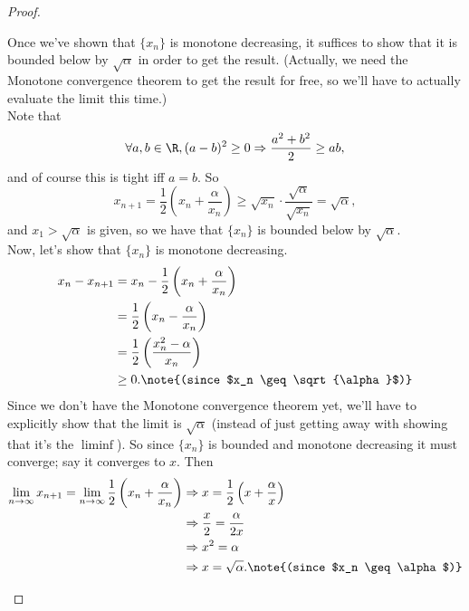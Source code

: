 \documentclass{assignment}
\begin{document}
\begin{proof}\leavevmode
  \begin{qparts}
  \item Once we've shown that $\{x_n\}$ is monotone decreasing, it suffices to show that it is bounded
  below by $\sqrt{\alpha}$ in order to get the result. (Actually, we need the Monotone convergence
  theorem to get the result for free, so we'll have to actually evaluate the limit this time.)\\

  Note that $$\forall a,b\in\R, (a-b)^2 \geq 0 \Rightarrow \frac{a^2 + b^2}{2} \geq ab,$$ and of
  course this is tight iff $a=b$. So $$x_{n+1} = \frac{1}{2}\left( x_n + \frac{\alpha}{x_n} \right)
  \geq \sqrt{x_n}\cdot \frac{\sqrt{\alpha}}{\sqrt{x_n}} = \sqrt{\alpha},$$ and $x_1 > \sqrt{\alpha}$
  is given, so we have that $\{x_n\}$ is bounded below by $\sqrt{\alpha}$. \\

  Now, let's show that $\{x_n\}$ is monotone decreasing.
  \begin{align*}
    x_n - x_{n+1} &= x_n - \frac{1}{2}\left( x_n + \frac{\alpha}{x_n} \right) \\
                  &= \frac{1}{2} \left( x_n - \frac{\alpha}{x_n} \right) \\
                  &= \frac{1}{2} \left( \frac{x_n^2 - \alpha}{x_n} \right) \\
                  &\geq 0. \note{(since $x_n \geq \sqrt{\alpha}$)}
  \end{align*}
  Since we don't have the Monotone convergence theorem yet, we'll have to explicitly show that the
  limit is $\sqrt{\alpha}$ (instead of just getting away with showing that it's the $\liminf$). So
  since $\{x_n\}$ is bounded and monotone decreasing it must converge; say it converges to $x$. Then 
  \begin{align*}
    \lim_{n\to\infty}x_{n+1} = \lim_{n\to\infty} \frac{1}{2}\left( x_n + \frac{\alpha}{x_n}\right) 
    &\Rightarrow x = \frac{1}{2}\left( x + \frac{\alpha}{x} \right) \\
    &\Rightarrow \frac{x}{2} = \frac{\alpha}{2x} \\
    &\Rightarrow x^2 = \alpha \\
    &\Rightarrow x = \sqrt{\alpha}. \note{(since $x_n \geq \alpha$)}
  \end{align*}


\end{qparts}
\end{proof}
\end{document}
